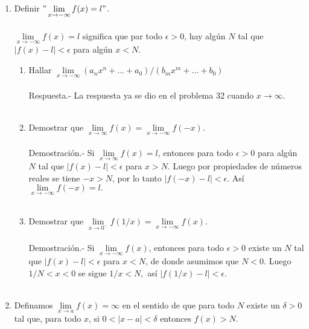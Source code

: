 \begin{enumerate}
\begin{enumerate}[\bfseries (i)]
\end{enumerate}

\item Definir $"\lim\limits_{x\to -\infty} f(x)=l"$.\\\\
     $\lim\limits_{x\to -\infty} f(x)=l$ significa que par todo $\epsilon>0$, hay algún $N$ tal que $|f(x)-l|<\epsilon$ para algún $x<N$.\\
\begin{enumerate}[\bfseries (a)]
    
    \item Hallar $\lim\limits_{x\to -\infty} (a_nx^n+...+a_0)/(b_mx^m+...+b_0)$\\\\
	Respuesta.-\; La respuesta ya se dio en el problema 32 cuando $x\to \infty$.\\\\ 
    
    \item Demostrar que $\lim\limits_{x\to \infty} f(x)=\lim\limits_{x\to -\infty}f(-x)$.\\\\
	Demostración.-\; Si $\lim\limits_{x\to \infty} f(x) = l$, entonces para todo $\epsilon>0$ para algún $N$ tal que $|f(x)-l|<\epsilon$ para $x>N$. Luego por propiedades de números reales se tiene $-x>N$, por lo tanto $|f(-x)-l|<\epsilon$. Así $\lim\limits_{x\to -\infty} f(-x)=l.$\\\\
    
    \item Demostrar que $\lim\limits_{x\to 0^-} f(1/x) = \lim\limits_{x\to -\infty} f(x).$\\\\
	Demostración.-\; Si $\lim\limits_{x\to -\infty} f(x)$, entonces para todo $\epsilon>0$ existe un $N$ tal que $|f(x)-l|<\epsilon$ para $x<N$, de donde asumimos que $N<0$. Luego $1/N<x<0$ se sigue $1/x<N,$ así $|f(1/x)-l|<\epsilon.$\\\\

\end{enumerate}

\item Definamos $\lim\limits_{x\to a} f(x) = \infty$ en el sentido de que para todo $N$ existe un $\delta>0$ tal que, para todo $x$, si $0<|x-a|<\delta$ entonces $f(x)>N$. 


\end{enumerate}
